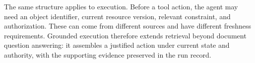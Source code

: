 The same structure applies to execution. Before a tool action, the agent may need an object identifier, current resource version, relevant constraint, and authorization. These can come from different sources and have different freshness requirements. Grounded execution therefore extends retrieval beyond document question answering: it assembles a justified action under current state and authority, with the supporting evidence preserved in the run record.

